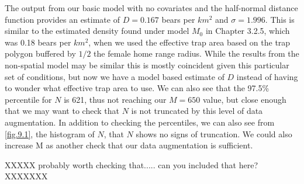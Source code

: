 The output from our basic model with no covariates and the half-normal
distance function provides an estimate of $D = 0.167$ bears per $km^2$
and $\sigma = 1.996$.  This is similar to the estimated density found
under model $M_0$ in Chapter 3.2.5, which was 0.18 bears per $km^2$,
when we used the effective trap area based on the trap polygon
buffered by $1/2$ the female home range radius.
While the results from the non-spatial model may be similar this is mostly coincident given this particular set of
conditions, but now we have a model based estimate of $D$ instead of having to wonder
what effective trap area to use.
We can also see that the 97.5\%
percentile for $N$ is 621, thus not reaching our $M=650$ value, but
close enough that we may want to check that $N$ is not truncated by
this level of data augmentation.  In addition to checking the percentiles, we can also see from \ref{fig.9.1}, the histogram of $N$, that $N$ shows no signs of truncation.  We could also increase
M as another check that our data augmentation is sufficient.


XXXXX probably worth checking that..... can you included that here? XXXXXXX

